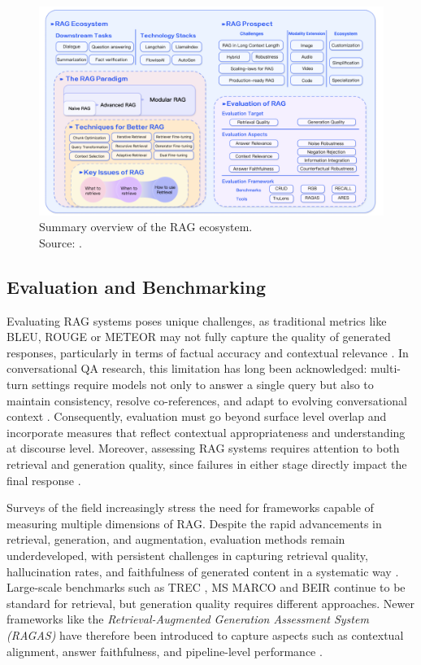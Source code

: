 \begin{spacing}{1.5}
\begin{figure}[H]
  \centering
  \includegraphics[width=\textwidth]{images/RAG_ecosystem.png} 
  \caption{Summary overview of the RAG ecosystem.\\
  \footnotesize{Source: \cite{gao_retrieval-augmented_2024}}.}
  \label{fig:summary_rag}
\end{figure}

\subsection{Evaluation and Benchmarking}\label{sec:eval_and_bench}
Evaluating RAG systems poses unique challenges, as traditional metrics like BLEU, ROUGE or METEOR may not fully capture the quality of generated responses, particularly in terms of factual accuracy and contextual relevance \citep{deriu_survey_2020}. In conversational QA research, this limitation has long been acknowledged: multi-turn settings require models not only to answer a single query but also to maintain consistency, resolve co-references, and adapt to evolving conversational context \citep{zaib_conversational_2022}. Consequently, evaluation must go beyond surface level overlap and incorporate measures that reflect contextual appropriateness and understanding at discourse level. Moreover, assessing RAG systems requires attention to both retrieval and generation quality, since failures in either stage directly impact the final response \citep{abeysinghe_challenges_2024}.

Surveys of the field increasingly stress the need for frameworks capable of measuring multiple dimensions of RAG. Despite the rapid advancements in retrieval, generation, and augmentation, evaluation methods remain underdeveloped, with persistent challenges in capturing retrieval quality, hallucination rates, and faithfulness of generated content in a systematic way \citep{gao_retrieval-augmented_2024}. Large-scale benchmarks such as TREC \citep{voorhees_trec_2005}, MS MARCO \citep{bajaj_ms_2018} and BEIR \citep{thakur_beir_2021} continue to be standard for retrieval, but generation quality requires different approaches. Newer frameworks like the \textit{Retrieval-Augmented Generation Assessment System (RAGAS)} have therefore been introduced to capture aspects such as contextual alignment, answer faithfulness, and pipeline-level performance \citep{es_ragas_2023}.


\end{spacing}
